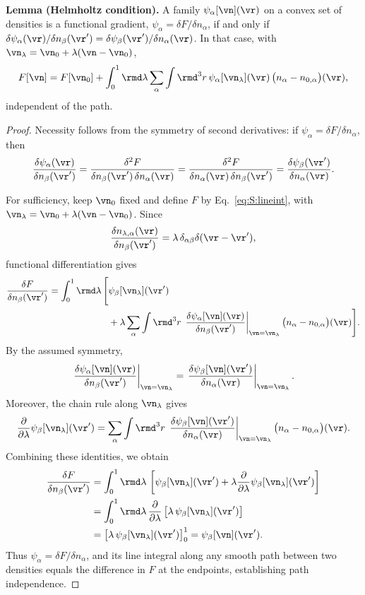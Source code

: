 \textbf{Lemma (Helmholtz condition).} A family $\psi_\alpha[\vn](\vr)$ on a convex set of densities is a functional gradient, $\psi_\alpha=\delta F/\delta n_\alpha$, if and only if $\delta\psi_\alpha(\vr)/\delta n_\beta(\vr')=\delta\psi_\beta(\vr')/\delta n_\alpha(\vr)$. In that case, with $\vn_\lambda=\vn_0+\lambda(\vn-\vn_0)$,
\begin{equation}
F[\vn]=F[\vn_0]+\int_0^1\rmd\lambda\sum_\alpha\int\rmd^3r\,\psi_\alpha[\vn_\lambda](\vr)\,\big(n_\alpha-n_{0,\alpha}\big)(\vr),
\label{eq:S:lineint}
\end{equation}
independent of the path.
\begin{proof}
Necessity follows from the symmetry of second derivatives:
if $\psi_\alpha=\delta F/\delta n_\alpha$, then
\[
\frac{\delta\psi_\alpha(\vr)}{\delta n_\beta(\vr')}
=
\frac{\delta^2F}{\delta n_\beta(\vr')\,\delta n_\alpha(\vr)}
=
\frac{\delta^2F}{\delta n_\alpha(\vr)\,\delta n_\beta(\vr')}
=
\frac{\delta\psi_\beta(\vr')}{\delta n_\alpha(\vr)}.
\]

For sufficiency, keep $\vn_0$ fixed and define $F$ by
Eq.~\ref{eq:S:lineint}, with
$\vn_\lambda=\vn_0+\lambda(\vn-\vn_0)$.
Since
\[
\frac{\delta n_{\lambda,\alpha}(\vr)}
     {\delta n_\beta(\vr')}
=
\lambda\,\delta_{\alpha\beta}\delta(\vr-\vr'),
\]
functional differentiation gives
\[
\begin{aligned}
\frac{\delta F}{\delta n_\beta(\vr')}
=
\int_0^1\rmd\lambda\,\Bigg[
&\psi_\beta[\vn_\lambda](\vr')\\
&+\lambda\sum_\alpha\int\rmd^3r\,
\left.
\frac{\delta\psi_\alpha[\vn](\vr)}
     {\delta n_\beta(\vr')}
\right|_{\vn=\vn_\lambda}
\big(n_\alpha-n_{0,\alpha}\big)(\vr)
\Bigg].
\end{aligned}
\]
By the assumed symmetry,
\[
\left.
\frac{\delta\psi_\alpha[\vn](\vr)}
     {\delta n_\beta(\vr')}
\right|_{\vn=\vn_\lambda}
=
\left.
\frac{\delta\psi_\beta[\vn](\vr')}
     {\delta n_\alpha(\vr)}
\right|_{\vn=\vn_\lambda}.
\]
Moreover, the chain rule along $\vn_\lambda$ gives
\[
\frac{\partial}{\partial\lambda}
\psi_\beta[\vn_\lambda](\vr')
=
\sum_\alpha\int\rmd^3r\,
\left.
\frac{\delta\psi_\beta[\vn](\vr')}
     {\delta n_\alpha(\vr)}
\right|_{\vn=\vn_\lambda}
\big(n_\alpha-n_{0,\alpha}\big)(\vr).
\]
Combining these identities, we obtain
\[
\begin{aligned}
\frac{\delta F}{\delta n_\beta(\vr')}
&=
\int_0^1\rmd\lambda\,
\left[
\psi_\beta[\vn_\lambda](\vr')
+\lambda\frac{\partial}{\partial\lambda}
\psi_\beta[\vn_\lambda](\vr')
\right]\\
&=
\int_0^1\rmd\lambda\,
\frac{\partial}{\partial\lambda}
\left[\lambda\,\psi_\beta[\vn_\lambda](\vr')\right]\\
&=
\left[\lambda\,\psi_\beta[\vn_\lambda](\vr')\right]_0^1
=
\psi_\beta[\vn](\vr').
\end{aligned}
\]
Thus $\psi_\alpha=\delta F/\delta n_\alpha$, and its line
integral along any smooth path between two densities equals
the difference in $F$ at the endpoints, establishing path
independence. 
\end{proof}


